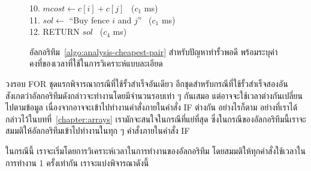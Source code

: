 \begin{figure}
\begin{algt}
10.\settowidth{\algbackindent}{10.}\hspace*{-\algbackindent}\hspace*{0.2in}\hspace*{0.2in}\hspace*{0.2in}\hspace*{0.2in} $mcost\leftarrow c[i]+c[j]$ \hfill\ ($c_1$ ms)\\
11.\settowidth{\algbackindent}{11.}\hspace*{-\algbackindent}\hspace*{0.2in}\hspace*{0.2in}\hspace*{0.2in}\hspace*{0.2in} $sol\leftarrow$ ``Buy fence $i$ and $j$'' \hfill\ ($c_1$ ms)\\
12.\settowidth{\algbackindent}{12.}\hspace*{-\algbackindent}\hspace*{0.2in} RETURN $sol$ \hfill\ ($c_4$ ms)
\end{algt}
\caption{อัล{\wbr}กอ{\wbr}ริ{\wbr}ทึม~\ref{algo:analysis-cheapest-pair} สำหรับ{\wbr}ปัญหา{\wbr}ทำ{\wbr}รั้ว{\wbr}พอดี พร้อม{\wbr}ระบุ{\wbr}ค่าคงที่{\wbr}ของ{\wbr}เวลา{\wbr}ที่{\wbr}ใช้{\wbr}ใน{\wbr}การ{\wbr}วิเคราะห์{\wbr}แบบ{\wbr}ละเอียด}
\label{fig:algo-analysis-cheapest-pair}
\end{figure}

วงรอบ FOR ชุด{\wbr}แรก{\wbr}พิจารณา{\wbr}กรณี{\wbr}ที่{\wbr}ใช้{\wbr}รั้ว{\wbr}สำเร็จ{\wbr}อัน{\wbr}เดียว อีก{\wbr}ชุด{\wbr}สำหรับ{\wbr}กรณี{\wbr}ที่{\wbr}ใช้{\wbr}รั้ว{\wbr}สำเร็จ{\wbr}สอง{\wbr}อัน{\wbr}
สังเกต{\wbr}ว่า{\wbr}อัล{\wbr}กอ{\wbr}ริ{\wbr}ทึม{\wbr}ดังกล่าว{\wbr}จะ{\wbr}ทำงาน{\wbr}โดย{\wbr}มี{\wbr}จำนวน{\wbr}รอบ{\wbr}เท่า ๆ กัน{\wbr}เสมอ{\wbr}
แต่{\wbr}อาจ{\wbr}จะ{\wbr}ใช้เวลา{\wbr}ต่าง{\wbr}กัน{\wbr}เปลี่ยน{\wbr}ไป{\wbr}ตาม{\wbr}ข้อมูล เนื่องจาก{\wbr}อาจ{\wbr}จะ{\wbr}เข้า{\wbr}ไป{\wbr}ทำงาน{\wbr}คำสั่ง{\wbr}ภายใน{\wbr}คำสั่ง{\wbr}
IF ต่าง{\wbr}กัน อย่างไรก็ตาม อย่าง{\wbr}ที่{\wbr}เรา{\wbr}ได้{\wbr}กล่าว{\wbr}ไว้{\wbr}ใน{\wbr}บท{\wbr}ที่~\ref{chapter:arrays}
เรา{\wbr}มักจะ{\wbr}สนใจ{\wbr}ใน{\wbr}กรณี{\wbr}ที่{\wbr}แย่{\wbr}ที่สุด{\wbr}
ซึ่ง{\wbr}ใน{\wbr}กรณี{\wbr}ของ{\wbr}อัล{\wbr}กอ{\wbr}ริ{\wbr}ทึม{\wbr}นี้{\wbr}เรา{\wbr}จะ{\wbr}สมมติ{\wbr}ให้{\wbr}อัล{\wbr}กอ{\wbr}ริ{\wbr}ทึม{\wbr}เข้า{\wbr}ไป{\wbr}ทำงาน{\wbr}ใน{\wbr}ทุก ๆ คำสั่ง{\wbr}ภายใน{\wbr}คำสั่ง IF

ใน{\wbr}กรณี{\wbr}นี้ เรา{\wbr}จะ{\wbr}เริ่ม{\wbr}โดย{\wbr}การ{\wbr}วิเคราะห์{\wbr}เวลา{\wbr}ใน{\wbr}การ{\wbr}ทำงาน{\wbr}ของ{\wbr}อัล{\wbr}กอ{\wbr}ริ{\wbr}ทึม{\wbr}
โดย{\wbr}สมมติ{\wbr}ให้{\wbr}ทุก{\wbr}คำสั่ง{\wbr}ใช้เวลา{\wbr}ใน{\wbr}การ{\wbr}ทำงาน 1 ครั้ง{\wbr}เท่า{\wbr}กัน เรา{\wbr}จะ{\wbr}แบ่ง{\wbr}พิจารณา{\wbr}ดังนี้{\wbr}

